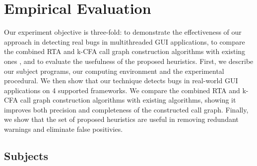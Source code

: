 \section{Empirical Evaluation}

Our experiment objective is three-fold: to demonstrate the effectiveness
of our approach in detecting real bugs in multithreaded GUI applications, to 
compare the combined RTA and k-CFA call graph construction algorithms
with existing ones , and to evaluate the usefulness of the proposed 
 heuristics. First, we describe our subject programs, our computing
environment and the experimental procedural. We then show that our technique
detects bugs in real-world GUI applications on
4 supported frameworks. We compare the combined RTA and k-CFA call graph
construction algorithms with existing algorithms, showing it improves
both precision and completeness of the constructed call graph.
 Finally, we show that the set of proposed heuristics are useful
in removing redundant warnings and eliminate false positivies. 



\subsection{Subjects}

